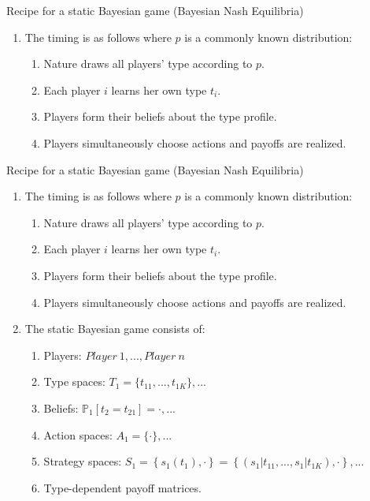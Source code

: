 \begin{frame}{Recipe for a static Bayesian game (Bayesian Nash Equilibria)}
    \begin{enumerate}
      \item The timing is as follows where $p$ is a commonly known distribution:
      \begin{enumerate}\normalsize
        \item Nature draws all players' type according to $p$.
        \item Each player $i$ learns her own type $t_{i}$.
        \item Players form their beliefs about the type profile.
        \item Players simultaneously choose actions and payoffs are realized.
      \end{enumerate}
    \end{enumerate}
    \vfill\null
\end{frame}
\begin{frame}{Recipe for a static Bayesian game (Bayesian Nash Equilibria)}
    \begin{enumerate}
      \item The timing is as follows where $p$ is a commonly known distribution:
      \begin{enumerate}\normalsize
        \item Nature draws all players' type according to $p$.
        \item Each player $i$ learns her own type $t_{i}$.
        \item Players form their beliefs about the type profile.
        \item Players simultaneously choose actions and payoffs are realized.
      \end{enumerate}
      \item The static Bayesian game consists of:
      \begin{enumerate}\normalsize
        \item Players: $Player\ 1,...,Player\ n$
        \item Type spaces: $T_1=\{t_{11},...,t_{1K}\},...$
        \item Beliefs: $\mathbb{P}_1[t_2=t_{21}]=\cdot,...$
        \item Action spaces: $A_1=\{\cdot\},...$
        \item Strategy spaces: $S_1=\left\{s_1(t_1),\cdot\right\}=\left\{(s_1|t_{11},...,s_1|t_{1K}),\cdot\right\},...$
        \item Type-dependent payoff matrices.
      \end{enumerate}
    \end{enumerate}
    \vfill\null
\end{frame}
